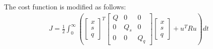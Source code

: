 The cost function is modified as follows:
\begin{align*}
J=\frac{1}{2}\int_{0}^{\infty} \left(\begin{bmatrix}x\\s\\q
\end{bmatrix}^T\begin{bmatrix}Q & 0 & 0\\0 & Q_s & 0\\0 & 0 & Q_q
\end{bmatrix}\begin{bmatrix}x\\s\\q
\end{bmatrix} + u^T R u \right) d t
\end{align*}